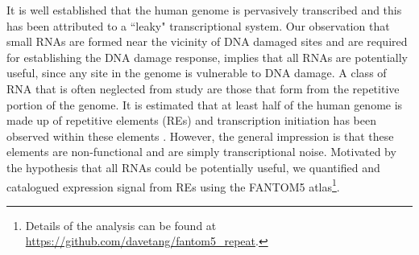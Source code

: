 It is well established that the human genome is pervasively transcribed and this has been attributed to a ``leaky" transcriptional system. Our observation that small RNAs are formed near the vicinity of DNA damaged sites and are required for establishing the DNA damage response, implies that all RNAs are potentially useful, since any site in the genome is vulnerable to DNA damage. A class of RNA that is often neglected from study are those that form from the repetitive portion of the genome. It is estimated that at least half of the human genome is made up of repetitive elements (REs) and transcription initiation has been observed within these elements \citep{pmid19377475}. However, the general impression is that these elements are non-functional and are simply transcriptional noise. Motivated by the hypothesis that all RNAs could be potentially useful, we quantified and catalogued expression signal from REs using the FANTOM5 atlas\footnote{Details of the analysis can be found at \url{https://github.com/davetang/fantom5_repeat}.}.
